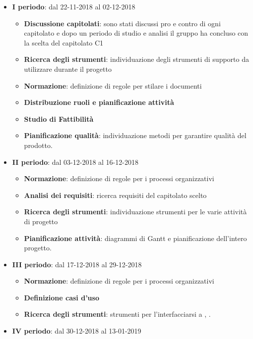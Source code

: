 		\begin{itemize}
			\item \textbf{I periodo}: dal 22-11-2018 al 02-12-2018
			\begin{itemize}
    	        \item \textbf{Discussione capitolati}: sono stati discussi pro e contro di ogni capitolato e dopo un periodo di
    	        studio e analisi il gruppo ha concluso con la scelta del capitolato C1 
    	        \item \textbf{Ricerca degli strumenti}: individuazione degli strumenti di supporto da utilizzare durante il progetto
    	        \item \textbf{Normazione}: definizione di regole per stilare i documenti
    	        \item \textbf{Distribuzione ruoli e pianificazione attività}
       	        \item \textbf{Studio di Fattibilità}
       	        \item \textbf{Pianificazione qualità}: individuazione metodi per garantire qualità del prodotto.
        	\end{itemize}
			\item \textbf{II periodo}: dal 03-12-2018 al 16-12-2018
			\begin{itemize}
    	        \item \textbf{Normazione}: definizione di regole per i processi organizzativi
    	        \item \textbf{Analisi dei requisiti}: ricerca requisiti del capitolato scelto
       	        \item \textbf{Ricerca degli strumenti}: individuazione strumenti per le varie attività di progetto
       	        \item \textbf{Pianificazione attività}: diagrammi di Gantt e pianificazione dell'intero progetto.
        	\end{itemize}
        	\item \textbf{III periodo}: dal 17-12-2018 al 29-12-2018
			\begin{itemize}
    	        \item \textbf{Normazione}: definizione di regole per i processi organizzativi
    	        \item \textbf{Definizione casi d'uso}
       	        \item \textbf{Ricerca degli strumenti}: strumenti per l'interfacciarsi a , .
        	\end{itemize}
        	\item \textbf{IV periodo}: dal 30-12-2018 al 13-01-2019

\end{itemize}
